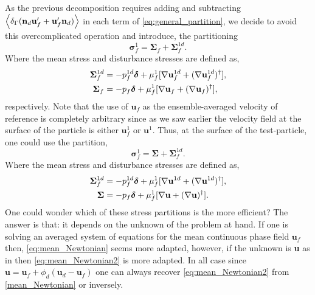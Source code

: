 As the previous decomposition requires adding and subtracting $\left<\delta_\Gamma (\textbf{n}_d \textbf{u}_f'+  \textbf{u}_f' \textbf{n}_d)\right>$ in each term of \ref{eq:general_partition}, we decide to avoid this overcomplicated operation and introduce, the partitioning 
\begin{equation}
    \bm\sigma_f^1 =
    \bm\Sigma_f + 
    \bm\Sigma_f^{1d}. 
    \label{eq:mean_Newtonian}
\end{equation}
Where the mean stress and disturbance stresses are defined as, 
\begin{align}
    \bm\Sigma_f^{1d}
    &=-p_f^{1d}\bm\delta + \mu_f^1 [\mathbf{\nabla} \textbf{u}^{1d}_f + (\mathbf{\nabla} \textbf{u}^{1d}_f)^\dagger], \\
    \bm\Sigma_f
    &=-p_f\bm\delta + \mu_f^1 [\mathbf{\nabla} \textbf{u}_f + (\mathbf{\nabla} \textbf{u}_f)^\dagger], 
\end{align}
respectively. 
Note that the use of $\textbf{u}_f$ as the ensemble-averaged velocity of reference is completely arbitrary since as we saw earlier the velocity field at the surface of the particle is either $\textbf{u}_f^1$ or $\textbf{u}^1$. 
Thus, at the surface of the test-particle, one could use the partition,
\begin{equation}
    \bm\sigma_f^1 =
    \bm\Sigma + 
    \bm\Sigma_f^{1d}. 
    \label{eq:mean_Newtonian2}
\end{equation}
Where the mean stress and disturbance stresses are defined as, 
\begin{align}
    \bm\Sigma_f^{1d}
    &=-p_f^{1d}\bm\delta + \mu_f^1 [\mathbf{\nabla} \textbf{u}^{1d} + (\mathbf{\nabla} \textbf{u}^{1d})^\dagger], \\
    \bm\Sigma
    &=-p_f\bm\delta + \mu_f^1 [\mathbf{\nabla} \textbf{u} + (\mathbf{\nabla} \textbf{u})^\dagger]. 
\end{align}
One could wonder which of these stress partitions is the more efficient? 
The answer is that: it depends on the unknown of the problem at hand. 
If one is solving an averaged system of equations for the mean continuous phase field $\textbf{u}_f$ then, \ref{eq:mean_Newtonian} seems more adapted, however, if the unknown is \textbf{u} as in then \ref{eq:mean_Newtonian2} is more adapted. 
In all case since $\textbf{u} = \textbf{u}_f + \phi_d (\textbf{u}_d - \textbf{u}_f)$ one can always recover \ref{eq:mean_Newtonian2} from \ref{mean_Newtonian} or inversely. 




